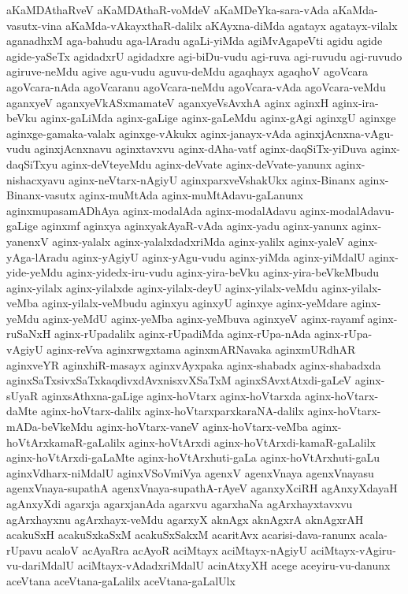 {aKaMDAthaRveV
aKaMDAthaR-voMdeV
aKaMDeYka-sara-vAda
aKaMda-vasutx-vina
aKaMda-vAkayxthaR-dalilx
aKAyxna-diMda
agatayx
agatayx-vilalx
aganadhxM
aga-bahudu
aga-lAradu
agaLi-yiMda
agiMvAgapeVti
agidu
agide
agide-yaSeTx
agidadxrU
agidadxre
agi-biDu-vudu
agi-ruva
agi-ruvudu
agi-ruvudo
agiruve-neMdu
agive
agu-vudu
aguvu-deMdu
agaqhayx
agaqhoV
agoVcara
agoVcara-nAda
agoVcaranu
agoVcara-neMdu
agoVcara-vAda
agoVcara-veMdu
aganxyeV
aganxyeVkASxmamateV
aganxyeVsAvxhA
aginx
aginxH
aginx-ira-beVku
aginx-gaLiMda
aginx-gaLige
aginx-gaLeMdu
aginx-gAgi
aginxgU
aginxge
aginxge-gamaka-valalx
aginxge-vAkukx
aginx-janayx-vAda
aginxjAcnxna-vAgu-vudu
aginxjAcnxnavu
aginxtavxvu
aginx-dAha-vatf
aginx-daqSiTx-yiDuva
aginx-daqSiTxyu
aginx-deVteyeMdu
aginx-deVvate
aginx-deVvate-yanunx
aginx-nishacxyavu
aginx-neVtarx-nAgiyU
aginxparxveVshakUkx
aginx-Binanx
aginx-Binanx-vasutx
aginx-muMtAda
aginx-muMtAdavu-gaLanunx
aginxmupasamADhAya
aginx-modalAda
aginx-modalAdavu
aginx-modalAdavu-gaLige
aginxmf
aginxya
aginxyakAyaR-vAda
aginx-yadu
aginx-yanunx
aginx-yanenxV
aginx-yalalx
aginx-yalalxdadxriMda
aginx-yalilx
aginx-yaleV
aginx-yAga-lAradu
aginx-yAgiyU
aginx-yAgu-vudu
aginx-yiMda
aginx-yiMdalU
aginx-yide-yeMdu
aginx-yidedx-iru-vudu
aginx-yira-beVku
aginx-yira-beVkeMbudu
aginx-yilalx
aginx-yilalxde
aginx-yilalx-deyU
aginx-yilalx-veMdu
aginx-yilalx-veMba
aginx-yilalx-veMbudu
aginxyu
aginxyU
aginxye
aginx-yeMdare
aginx-yeMdu
aginx-yeMdU
aginx-yeMba
aginx-yeMbuva
aginxyeV
aginx-rayamf
aginx-ruSaNxH
aginx-rUpadalilx
aginx-rUpadiMda
aginx-rUpa-nAda
aginx-rUpa-vAgiyU
aginx-reVva
aginxrwgxtama
aginxmARNavaka
aginxmURdhAR
aginxveYR
aginxhiR-masayx
aginxvAyxpaka
aginx-shabadx
aginx-shabadxda
aginxSaTxsivxSaTxkaqdivxdAvxnisxvXSaTxM
aginxSAvxtAtxdi-gaLeV
aginx-sUyaR
aginxsAthxna-gaLige
aginx-hoVtarx
aginx-hoVtarxda
aginx-hoVtarx-daMte
aginx-hoVtarx-dalilx
aginx-hoVtarxparxkaraNA-dalilx
aginx-hoVtarx-mADa-beVkeMdu
aginx-hoVtarx-vaneV
aginx-hoVtarx-veMba
aginx-hoVtArxkamaR-gaLalilx
aginx-hoVtArxdi
aginx-hoVtArxdi-kamaR-gaLalilx
aginx-hoVtArxdi-gaLaMte
aginx-hoVtArxhuti-gaLa
aginx-hoVtArxhuti-gaLu
aginxVdharx-niMdalU
aginxVSoVmiVya
agenxV
agenxVnaya
agenxVnayasu
agenxVnaya-supathA
agenxVnaya-supathA-rAyeV
aganxyXciRH
agAnxyXdayaH
agAnxyXdi
agarxja
agarxjanAda
agarxvu
agarxhaNa
agArxhayxtavxvu
agArxhayxnu
agArxhayx-veMdu
agarxyX
aknAgx
aknAgxrA
aknAgxrAH
acakuSxH
acakuSxkaSxM
acakuSxSakxM
acaritAvx
acarisi-dava-ranunx
acala-rUpavu
acaloV
acAyaRra
acAyoR
aciMtayx
aciMtayx-nAgiyU
aciMtayx-vAgiru-vu-dariMdalU
aciMtayx-vAdadxriMdalU
acinAtxyXH
acege
aceyiru-vu-danunx
aceVtana
aceVtana-gaLalilx
aceVtana-gaLalUlx
}
